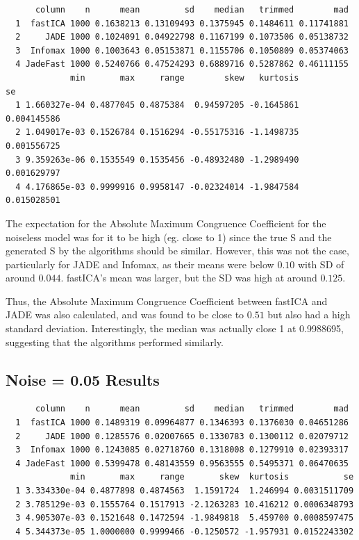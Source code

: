 \documentclass[12pt,twoside]{amherstthesis}
\begin{document}
  \begin{verbatim}
      column    n      mean         sd    median   trimmed        mad
  1  fastICA 1000 0.1638213 0.13109493 0.1375945 0.1484611 0.11741881
  2     JADE 1000 0.1024091 0.04922798 0.1167199 0.1073506 0.05138732
  3  Infomax 1000 0.1003643 0.05153871 0.1155706 0.1050809 0.05374063
  4 JadeFast 1000 0.5240766 0.47524293 0.6889716 0.5287862 0.46111155
             min       max     range        skew   kurtosis          se
  1 1.660327e-04 0.4877045 0.4875384  0.94597205 -0.1645861 0.004145586
  2 1.049017e-03 0.1526784 0.1516294 -0.55175316 -1.1498735 0.001556725
  3 9.359263e-06 0.1535549 0.1535456 -0.48932480 -1.2989490 0.001629797
  4 4.176865e-03 0.9999916 0.9958147 -0.02324014 -1.9847584 0.015028501
  \end{verbatim}
  
  The expectation for the Absolute Maximum Congruence Coefficient for the
  noiseless model was for it to be high (eg. close to 1) since the true S
  and the generated S by the algorithms should be similar. However, this
  was not the case, particularly for JADE and Infomax, as their means were
  below \(0.10\) with SD of around \(0.044\). fastICA's mean was larger,
  but the SD was high at around \(0.125\).
  
  Thus, the Absolute Maximum Congruence Coefficient between fastICA and
  JADE was also calculated, and was found to be close to \(0.51\) but also
  had a high standard deviation. Interestingly, the median was actually
  close 1 at 0.9988695, suggesting that the algorithms performed
  similarly.
  
  \subsection{Noise = 0.05 Results}\label{noise-0.05-results}
  
  \begin{verbatim}
      column    n      mean         sd    median   trimmed        mad
  1  fastICA 1000 0.1489319 0.09964877 0.1346393 0.1376030 0.04651286
  2     JADE 1000 0.1285576 0.02007665 0.1330783 0.1300112 0.02079712
  3  Infomax 1000 0.1243085 0.02718760 0.1318008 0.1279910 0.02393317
  4 JadeFast 1000 0.5399478 0.48143559 0.9563555 0.5495371 0.06470635
             min       max     range       skew  kurtosis           se
  1 3.334330e-04 0.4877898 0.4874563  1.1591724  1.246994 0.0031511709
  2 3.785129e-03 0.1555764 0.1517913 -2.1263283 10.416212 0.0006348793
  3 4.905307e-03 0.1521648 0.1472594 -1.9849818  5.459700 0.0008597475
  4 5.344373e-05 1.0000000 0.9999466 -0.1250572 -1.957931 0.0152243302
  \end{verbatim}
  
\end{document}
